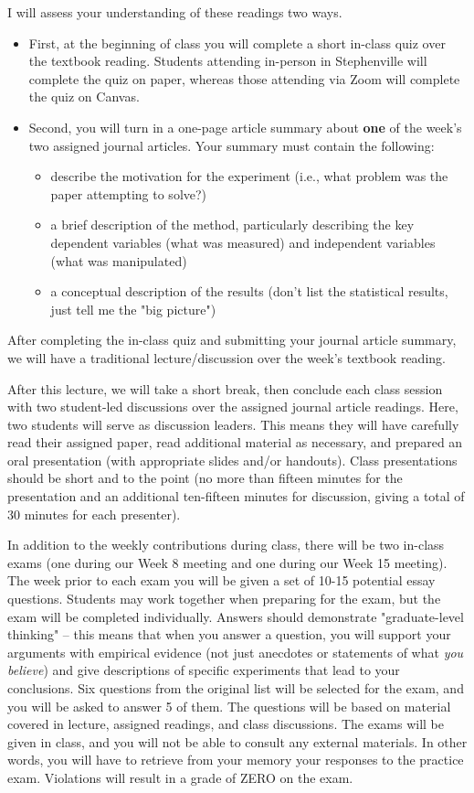 \documentclass[10pt]{article}
\begin{document}
I will assess your understanding of these readings two ways.
\begin{itemize}
\item First, at the beginning of class you will complete a short in-class quiz over the textbook reading. Students attending in-person in Stephenville will complete the quiz on paper, whereas those attending via Zoom will complete the quiz on Canvas.
\item Second, you will turn in a one-page article summary about \textbf{one} of the week's two assigned journal articles.  Your summary must contain the following:
\begin{itemize}
\item describe the motivation for the experiment (i.e., what problem was the paper attempting to solve?)
\item a brief description of the method, particularly describing the key dependent variables (what was measured) and independent variables (what was manipulated)
\item a conceptual description of the results (don't list the statistical results, just tell me the "big picture")
\end{itemize}
\end{itemize}

After completing the in-class quiz and submitting your journal article summary, we will have a traditional lecture/discussion over the week's textbook reading.

After this lecture, we will take a short break, then conclude each class session with two student-led discussions over the assigned journal article readings. Here, two students will serve as discussion leaders.  This means they will have carefully read their assigned paper, read additional material as necessary, and prepared an oral presentation (with appropriate slides and/or handouts).  Class presentations should be short and to the point (no more than fifteen minutes for the presentation and an additional ten-fifteen minutes for discussion, giving a total of 30 minutes for each presenter).

In addition to the weekly contributions during class, there will be two in-class exams (one during our Week 8 meeting and one during our Week 15 meeting).  The week prior to each exam you will be given a set of 10-15 potential essay questions. Students may work together when preparing for the exam, but the exam will be completed individually. Answers should demonstrate "graduate-level thinking" -- this means that when you answer a question, you will support your arguments with empirical evidence (not just anecdotes or statements of what \emph{you believe}) and give descriptions of specific experiments that lead to your conclusions. Six questions from the original list will be selected for the exam, and you will be asked to answer 5 of them. The questions will be based on material covered in lecture, assigned readings, and class discussions. The exams will be given in class, and you will not be able to consult any external materials.  In other words, you will have to retrieve from your memory your responses to the practice exam.  Violations will result in a grade of ZERO on the exam.
\end{document}
